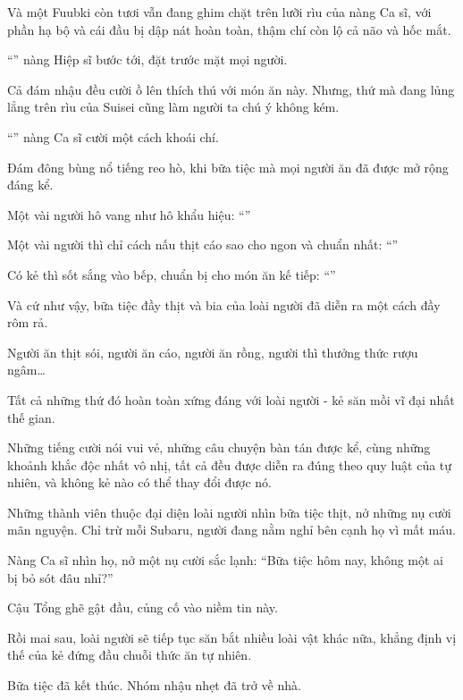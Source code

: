 \documentclass[../main.tex]{subfiles}
\begin{document}
Và một Fuubki còn tươi vẫn đang ghim chặt trên lưỡi rìu của nàng Ca sĩ, với phần hạ bộ và cái đầu bị dập nát hoàn toàn, thậm chí còn lộ cả não và hốc mắt.

``'' nàng Hiệp sĩ bước tới, đặt trước mặt mọi người.

Cả đám nhậu đều cười ồ lên thích thú với món ăn này. Nhưng, thứ mà đang lủng lẳng trên rìu của Suisei cũng làm người ta chú ý không kém.

``'' nàng Ca sĩ cười một cách khoái chí.

Đám đông bùng nổ tiếng reo hò, khi bữa tiệc mà mọi người ăn đã được mở rộng đáng kể.

Một vài người hô vang như hô khẩu hiệu: ``''

Một vài người thì chỉ cách nấu thịt cáo sao cho ngon và chuẩn nhất: ``''

Có kẻ thì sốt sắng vào bếp, chuẩn bị cho món ăn kế tiếp: ``''

Và cứ như vậy, bữa tiệc đầy thịt và bia của loài người đã diễn ra một cách đầy rôm rả.

Người ăn thịt sói, người ăn cáo, người ăn rồng, người thì thưởng thức rượu ngâm\dots

Tất cả những thứ đó hoàn toàn xứng đáng với loài người - kẻ săn mồi vĩ đại nhất thế gian.

Những tiếng cười nói vui vẻ, những câu chuyện bàn tán được kể, cùng những khoảnh khắc độc nhất vô nhị, tất cả đều được diễn ra đúng theo quy luật của tự nhiên, và không kẻ nào có thể thay đổi được nó.

Những thành viên thuộc đại diện loài người nhìn bữa tiệc thịt, nở những nụ cười mãn nguyện. Chỉ trừ mỗi Subaru, người đang nằm nghỉ bên cạnh họ vì mất máu.

Nàng Ca sĩ nhìn họ, nở một nụ cười sắc lạnh: ``Bữa tiệc hôm nay, không một ai bị bỏ sót đâu nhỉ?''

Cậu Tổng ghẽ gật đầu, củng cố vào niềm tin này.

Rồi mai sau, loài người sẽ tiếp tục săn bắt nhiều loài vật khác nữa, khẳng định vị thế của kẻ đứng đầu chuỗi thức ăn tự nhiên.

\ct

Bữa tiệc đã kết thúc. Nhóm nhậu nhẹt đã trở về nhà.
\end{document}
